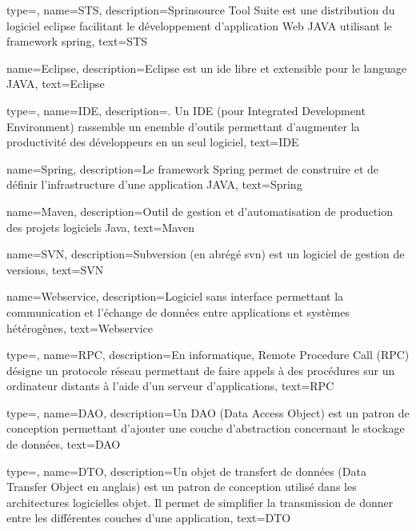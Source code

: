 {
    type=\acronymtype,
    name={STS},
    description={Sprinsource Tool Suite est une distribution du logiciel \gls{eclipse} facilitant le développement d'application Web JAVA utilisant le framework \gls{spring}},
    text={STS}
}

{
    name={Eclipse},
    description={Eclipse est un \gls{ide} libre et extensible pour le language JAVA},
    text={Eclipse}
}

{
    type=\acronymtype,
    name={IDE},
    description={. Un IDE (pour Integrated Development Environment) rassemble un enemble d'outils permettant d'augmenter la productivité des développeurs en un seul logiciel},
    text={IDE}
}

{
    name={Spring},
    description={Le framework Spring permet de construire et de définir l'infrastructure d'une application JAVA},
    text={Spring}
}

{
    name={Maven},
    description={Outil de gestion et d'automatisation de production des projets logiciels Java},
    text={Maven}
}

{
    name={SVN},
    description={Subversion (en abrégé svn) est un logiciel de gestion de versions\cite{wiki:svn}},
    text={SVN}
}


{
    name={Webservice},
    description={Logiciel sans interface permettant la communication et l'échange de données entre applications et systèmes hétérogènes},
    text={Webservice}
}

{
    type=\acronymtype,
    name={RPC},
    description={En informatique, Remote Procedure Call (RPC) désigne un protocole réseau permettant de faire appels à des procédures sur un ordinateur distants à l'aide d'un serveur d'applications},
    text={RPC}
}

{
    type=\acronymtype,
    name={DAO},
    description={Un DAO (Data Access Object) est un patron de conception permettant d'ajouter une couche d'abstraction concernant le stockage de données},
    text={DAO}
}

{
    type=\acronymtype,
    name={DTO},
    description={Un objet de transfert de données (Data Transfer Object en anglais) est un patron de conception utilisé dans les architectures logicielles objet. Il permet de simplifier la transmission de donner entre les différentes couches d'une application},
    text={DTO}
}

